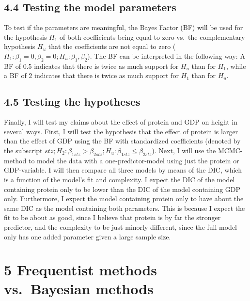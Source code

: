\documentclass[
]{article}
\begin{document}
\hypertarget{testing-the-model-parameters}{%
\subsection{4.4 Testing the model
parameters}\label{testing-the-model-parameters}}

To test if the parameters are meaningful, the Bayes Factor (BF) will be
used for the hypothesis \(H_1\) of both coefficients being equal to zero
vs.~the complementary hypothesis \(H_u\) that the coefficients are not
equal to zero (\(H_1: \beta_1 = 0, \beta_2 = 0; H_u: \beta_1,\beta_2\)).
The BF can be interpreted in the following way: A BF of 0.5 indicates
that there is twice as much support for \(H_u\) than for \(H_1\), while
a BF of 2 indicates that there is twice as much support for \(H_1\) than
for \(H_u\).

\hypertarget{testing-the-hypotheses}{%
\subsection{4.5 Testing the hypotheses}\label{testing-the-hypotheses}}

Finally, I will test my claims about the effect of protein and GDP on
height in several ways. First, I will test the hypothesis that the
effect of protein is larger than the effect of GDP using the BF with
standardized coefficients (denoted by the subscript
\(stz; H_2: \beta_{1stz} > \beta_{2stz}; H_u: \beta_{1stz} ≤ \beta_{2stz}\)).
Next, I will use the MCMC-method to model the data with a
one-predictor-model using just the protein or GDP-variable. I will then
compare all three models by means of the DIC, which is a function of the
model's fit and complexity. I expect the DIC of the model containing
protein only to be lower than the DIC of the model containing GDP only.
Furthermore, I expect the model containing protein only to have about
the same DIC as the model containing both parameters. This is because I
expect the fit to be about as good, since I believe that protein is by
far the stronger predictor, and the complexity to be just minorly
different, since the full model only has one added parameter given a
large sample size.

\hypertarget{frequentist-methods-vs.-bayesian-methods}{%
\section{5 Frequentist methods vs.~Bayesian
methods}\label{frequentist-methods-vs.-bayesian-methods}}
\end{document}
